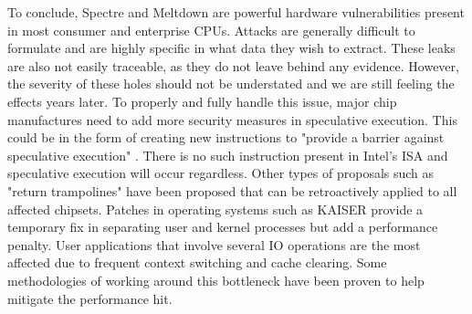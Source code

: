 \documentclass[conference]{IEEEtran}
\begin{document}
To conclude, Spectre and Meltdown are powerful hardware vulnerabilities present in most consumer and enterprise CPUs.
Attacks are generally difficult to formulate and are highly specific in what data they wish to extract.
These leaks are also not easily traceable, as they do not leave behind any evidence.
However, the severity of these holes should not be understated and we are still feeling the effects years later.
To properly and fully handle this issue, major chip manufactures need to add more security measures in speculative execution.
This could be in the form of creating new instructions to "provide a barrier against speculative execution" \autocite[3]{ijmsit526310}.
There is no such instruction present in Intel's ISA and speculative execution will occur regardless.
Other types of proposals such as "return trampolines" have been proposed that can be retroactively applied to all affected chipsets.
Patches in operating systems such as KAISER provide a temporary fix in separating user and kernel processes but add a performance penalty.
User applications that involve several IO operations are the most affected due to frequent context switching and cache clearing.
Some methodologies of working around this bottleneck have been proven to help mitigate the performance hit.

\printbibliography
\end{document}
